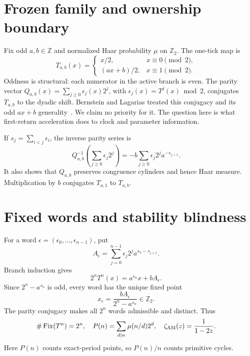 \documentclass[10pt]{article}
\newcommand{\Ztwo}{\mathbb Z_2}
\newcommand{\Fix}{\operatorname{Fix}}
\begin{document}
\section{Frozen family and ownership boundary}
Fix odd $a,b\in\mathbb Z$ and normalized Haar probability $\mu$ on $\Ztwo$.
The one-tick map is
\begin{equation}\label{eq:T}
T_{a,b}(x)=
\begin{cases}
x/2,&x\equiv0\pmod2,\\
(ax+b)/2,&x\equiv1\pmod2.
\end{cases}
\end{equation}
Oddness is structural: each numerator in the active branch is even.  The
parity vector $Q_{a,b}(x)=\sum_{j\ge0}\epsilon_j(x)2^j$, with
$\epsilon_j(x)=T^j(x)\bmod2$, conjugates $T_{a,b}$ to the dyadic shift.
Bernstein and Lagarias treated this conjugacy and its odd $ax+b$
generality~\cite{bernstein-lagarias}.  We claim no priority for it.  The
question here is what first-return acceleration does to clock and parameter
information.

If $s_j=\sum_{i<j}\epsilon_i$, the inverse parity series is
\begin{equation}\label{eq:inverse}
Q_{a,b}^{-1}\!\left(\sum_{j\ge0}\epsilon_j2^j\right)
=-b\sum_{j\ge0}\epsilon_j2^j a^{-s_{j+1}}.
\end{equation}
It also shows that $Q_{a,b}$ preserves congruence cylinders and hence Haar
measure.  Multiplication by $b$ conjugates $T_{a,1}$ to $T_{a,b}$.

\section{Fixed words and stability blindness}
For a word $\epsilon=(\epsilon_0,\ldots,\epsilon_{n-1})$, put
\[
A_\epsilon=\sum_{j=0}^{n-1}\epsilon_j2^j a^{s_n-s_{j+1}}.
\]
Branch induction gives
\begin{equation}\label{eq:iterate}
2^nT^n(x)=a^{s_n}x+bA_\epsilon.
\end{equation}
Since $2^n-a^{s_n}$ is odd, every word has the unique fixed point
\begin{equation}\label{eq:fixed}
x_\epsilon=\frac{bA_\epsilon}{2^n-a^{s_n}}\in\Ztwo.
\end{equation}
The parity conjugacy makes all $2^n$ words admissible and distinct.  Thus
\begin{equation}\label{eq:counts}
\#\Fix(T^n)=2^n,
\quad P(n)=\sum_{d\mid n}\mu(n/d)2^d,
\quad \zeta_{\rm AM}(z)=\frac1{1-2z}.
\end{equation}
Here $P(n)$ counts exact-period points, so $P(n)/n$ counts primitive cycles.
\end{document}
